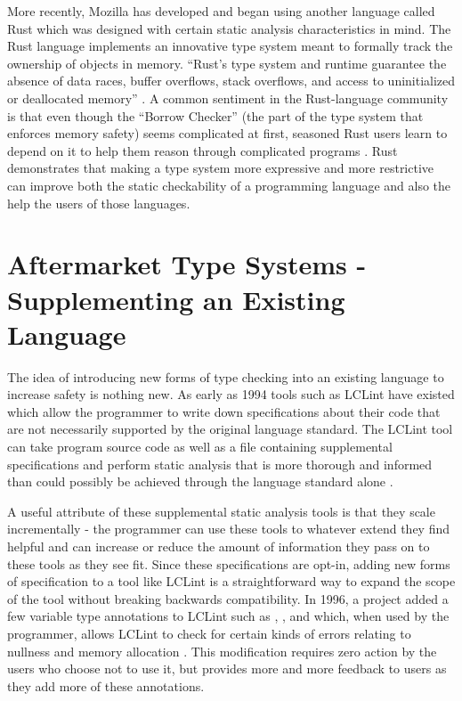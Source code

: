 More recently, Mozilla has developed and began using another language called Rust which was designed with certain static analysis characteristics in mind.  The Rust language implements an innovative type system meant to formally track the ownership of objects in memory.  ``Rust's type system and runtime guarantee the absence of data races, buffer overflows, stack overflows, and access to uninitialized or deallocated memory'' \cite{rust-is-dope}.  A common sentiment in the Rust-language community is that even though the ``Borrow Checker'' (the part of the type system that enforces memory safety) seems complicated at first, seasoned Rust users learn to depend on it to help them reason through complicated programs  \cite{rust-lang-spec}.  Rust demonstrates that making a type system more expressive and more restrictive can improve both the static checkability of a programming language and also the help the users of those languages.  

\section{Aftermarket Type Systems - Supplementing an Existing Language}\label{sec:related:aftermarket}

The idea of introducing new forms of type checking into an existing language to increase safety is nothing new.  As early as 1994 tools such as LCLint have existed which allow the programmer to write down specifications about their code that are not necessarily supported by the original language standard.  The LCLint tool can take program source code as well as a file containing supplemental specifications and perform static analysis that is more thorough and informed than could possibly be achieved through the language standard alone \cite{lclint-og}. 

A useful attribute of these supplemental static analysis tools is that they scale incrementally - the programmer can use these tools to whatever extend they find helpful and can increase or reduce the amount of information they pass on to these tools as they see fit.  Since these specifications are opt-in, adding new forms of specification to a tool like LCLint is a straightforward way to expand the scope of the tool without breaking backwards compatibility.  In 1996, a project added a few variable type annotations to LCLint such as , , and  which, when used by the programmer, allows LCLint to check for certain kinds of errors relating to nullness and memory allocation \cite{lclint-memory}.  This modification requires zero action by the users who choose not to use it, but provides more and more feedback to users as they add more of these annotations.  

